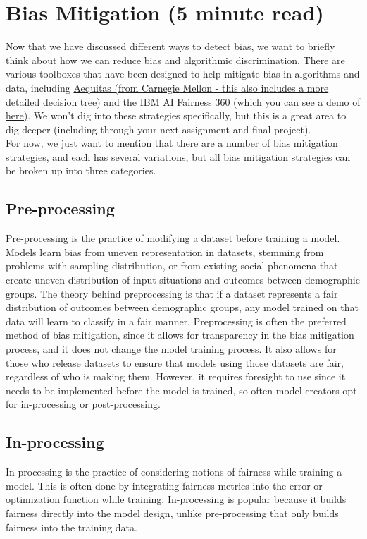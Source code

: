 \documentclass[assignment03_Solutions]{subfiles}
\begin{document}
\section*{Bias Mitigation (5 minute read)}

Now that we have discussed different ways to detect bias, we want to briefly think about how we can reduce bias and algorithmic discrimination. There are various toolboxes that have been designed to help mitigate bias in algorithms and data, including \href{http://www.datasciencepublicpolicy.org/our-work/tools-guides/aequitas/}{Aequitas (from Carnegie Mellon - this also includes a more detailed decision tree)} and the \href{http://aif360.mybluemix.net/data}{IBM AI Fairness 360 (which you can see a demo of here)}. We won't dig into these strategies specifically, but this is a great area to dig deeper (including through your next assignment and final project).\\ 
For now, we just want to mention that there are a number of bias mitigation strategies, and each has several variations, but all bias mitigation strategies can be broken up into three categories.
 \subsection*{Pre-processing}
 Pre-processing is the practice of modifying a dataset before training a model. Models learn bias from uneven representation in datasets, stemming from problems with sampling distribution, or from existing social phenomena that create uneven distribution of input situations and outcomes between demographic groups. The theory behind preprocessing is that if a dataset represents a fair distribution of outcomes between demographic groups, any model trained on that data will learn to classify in a fair manner. Preprocessing is often the preferred method of bias mitigation, since it allows for transparency in the bias mitigation process, and it does not change the model training process. It also allows for those who release datasets to ensure that models using those datasets are fair, regardless of who is making them. However, it requires foresight to use since it needs to be implemented before the model is trained, so often model creators opt for in-processing or post-processing.
 \subsection*{In-processing}
 In-processing is the practice of considering notions of fairness while training a model. This is often done by integrating fairness metrics into the error or optimization function while training. In-processing is popular because it builds fairness directly into the model design, unlike pre-processing that only builds fairness into the training data.
\end{document}

